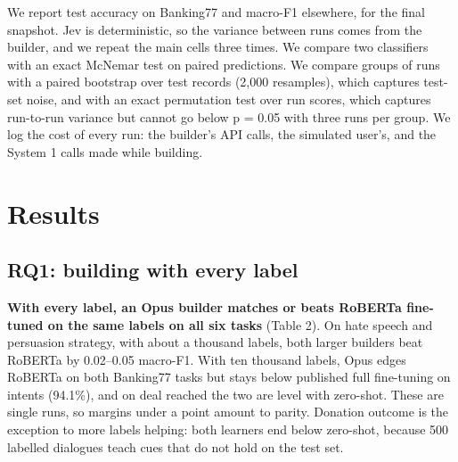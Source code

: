\documentclass[11pt]{article}
\begin{document}
We report test accuracy on Banking77 and macro-F1 elsewhere, for the final snapshot. Jev is deterministic, so the variance between runs comes from the builder, and we repeat the main cells three times. We compare two classifiers with an exact McNemar test on paired predictions. We compare groups of runs with a paired bootstrap over test records (2,000 resamples), which captures test-set noise, and with an exact permutation test over run scores, which captures run-to-run variance but cannot go below p = 0.05 with three runs per group. We log the cost of every run: the builder's API calls, the simulated user's, and the System 1 calls made while building.

\section{Results}

\subsection{RQ1: building with every label}

\textbf{With every label, an Opus builder matches or beats RoBERTa fine-tuned on the same labels on all six tasks} (Table 2). On hate speech and persuasion strategy, with about a thousand labels, both larger builders beat RoBERTa by 0.02--0.05 macro-F1. With ten thousand labels, Opus edges RoBERTa on both Banking77 tasks but stays below published full fine-tuning on intents (94.1\%), and on deal reached the two are level with zero-shot. These are single runs, so margins under a point amount to parity. Donation outcome is the exception to more labels helping: both learners end below zero-shot, because 500 labelled dialogues teach cues that do not hold on the test set.
\end{document}
